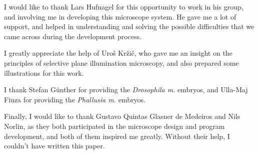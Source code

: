 \documentclass{diploma_style}
\begin{document}
\newpage
\cleardoublepage
{}
\begin{acknowledgements}

I would like to thank Lars Hufnagel for this opportunity to work in his group, and involving me in developing this microscope system. He gave me a lot of support, and helped in understanding and solving the possible difficulties that we came across during the development process.

I greatly appreciate the help of Uroš Kržič, who gave me an insight on the principles of selective plane illumination microscopy, and also prepared some illustrations for this work.

I thank Stefan Günther for providing the \textit{Drosophila m.} embryos, and \mbox{Ulla-Maj} Fiuza for providing the \textit{Phallusia m.} embryos.

Finally, I would like to thank Gustavo Quintas Glasner de Medeiros and Nils Norlin, as they both participated in the microscope design and program development, and both of them inspired me greatly. Without their help, I couldn't have written this paper.

\end{acknowledgements}

\cleardoublepage
{}
{}

{ \footnotesize }
\end{document}
